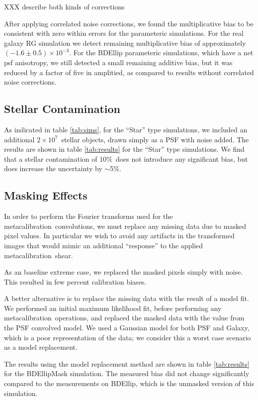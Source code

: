 \documentclass[usegraphicx,usenatbib]{mn2e}
\newcommand{\mcal}{metacalibration}
\newcommand{\nsimNStarTwo}{$2 \times 10^7$}
\newcommand{\nsimNstarperc}{10\%}
\newcommand{\rgbias}{$(-1.6 \pm 0.5) \times 10^{-3}$}
\begin{document}
XXX describe both kinds of corrections

After applying correlated noise corrections, we found the multiplicative bias
to be consistent with zero within errors for the parameteric simulations. For
the real galaxy RG simulation we detect remaining multiplicative bias of
approximately \rgbias.  For the BDEllip parameteric simulations, which have a
net psf anisotropy, we still detected a small remaining additive bias, but it
was reduced by a factor of five in amplitied, as compared to results without
correlated noise corrections.

\subsection{Stellar Contamination} \label{sec:stars}

As indicated in table \ref{tab:sims}, for the ``Star'' type simulations, we
included an additional \nsimNStarTwo\ stellar objects, drawn simply as a PSF with
noise added.  The results are shown in table \ref{tab:results} for the ``Star''
type simulations.  We find that a stellar contamination of 
\nsimNstarperc\ does not introduce any significant bias, but does
increase the uncertainty by $\sim$5\%.

\subsection{Masking Effects} \label{sec:masking}

In order to perform the Fourier transforms used for the \mcal\ convolutions, we
must replace any missing data due to masked pixel values.  In particular we
wish to avoid any artifacts in the transformed images that would mimic an
additional ``response'' to the applied \mcal\ shear.

As an baseline extreme case, we replaced the masked pixels simply with noise.
This resulted in few percent calibration biases.

A better alternative is to replace the missing data with the result of a model
fit.  We performed an initial maximum likelihood fit, before performing any
\mcal\ operations, and replaced the masked data with the value from the PSF
convolved model.  We used a Gaussian model for both PSF and Galaxy, which is a
poor representation of the data; we consider this a worst case scenario as a
model replacement. 

The results using the model replacement method are shown in table
\ref{tab:results} for the BDEllipMask simulation.  The measured bias did not
change significantly compared to the measurements on BDEllip, which is the
unmasked version of this simulation.
\end{document}

